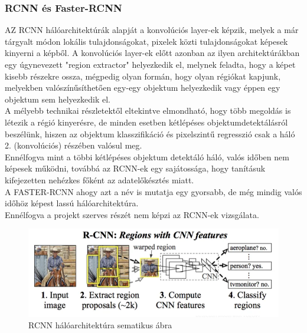 \documentclass{article}
\begin{document}
\subsubsection{RCNN és Faster-RCNN}
AZ RCNN hálóarchitektúrák alapját a konvolúciós layer-ek
képzik, melyek a már tárgyalt módon lokális tulajdonságokat, 
pixelek közti tulajdonságokat képesek kinyerni a képből. 
A konvolúciós layer-ek előtt azonban az ilyen architektúrákban 
egy úgynevezett "region extractor" helyezkedik el, 
melynek feladta, hogy a képet kisebb részekre ossza, 
mégpedig olyan formán, hogy olyan régiókat kapjunk, 
melyekben valószínűsíthetően egy-egy objektum helyezkedik 
vagy éppen egy objektum sem helyezkedik el.\\[5pt]
A mélyebb technikai részletektől eltekintve elmondható, hogy 
több megoldás is létezik a régió kinyerésre, de minden esetben 
kétlépéses objektumdetektálásról beszélünk, hiszen 
az objektum klasszifikáció és pixelszintű regresszió 
csak a háló 2. (konvolúciós) részében valósul meg.\\
Ennélfogva mint a többi kétlépéses objektum detektáló háló,
valós időben nem képesek működni, továbbá az RCNN-ek egy sajátossága, 
hogy tanításuk kifejezetten nehézkes főként az adatelőkésztés 
miatt.\\[5pt]
A FASTER-RCNN ahogy azt a név is mutatja egy gyorsabb, 
de még mindig valós időhöz képest lassú hálóarchitektúra.\\[5pt]
Ennélfogva a projekt szerves részét nem képzi az RCNN-ek 
vizsgálata.
\begin{figure}[h]
    \centering
    \includegraphics[scale=0.7]{rcnn.png}
    \caption{RCNN hálóarchitektúra sematikus ábra}
\end{figure} 
\end{document}
